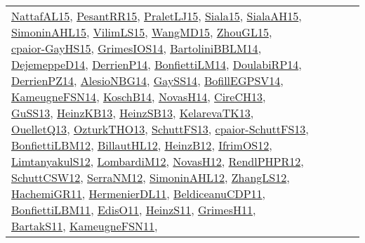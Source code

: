 {\begin{longtable}{lp{3cm}>{\raggedright}p{6cm}>{\raggedright}p{6cm}p{8cm}}
\href{articles/NattafAL15.pdf}{NattafAL15}\cite{NattafAL15}, \href{papers/PesantRR15.pdf}{PesantRR15}\cite{PesantRR15}, \href{papers/PraletLJ15.pdf}{PraletLJ15}\cite{PraletLJ15}, \href{articles/Siala15.pdf}{Siala15}\cite{Siala15}, \href{papers/SialaAH15.pdf}{SialaAH15}\cite{SialaAH15}, \href{articles/SimoninAHL15.pdf}{SimoninAHL15}\cite{SimoninAHL15}, \href{papers/VilimLS15.pdf}{VilimLS15}\cite{VilimLS15}, \href{articles/WangMD15.pdf}{WangMD15}\cite{WangMD15}, \href{papers/ZhouGL15.pdf}{ZhouGL15}\cite{ZhouGL15}, \href{papers/cpaior-GayHS15.pdf}{cpaior-GayHS15}\cite{cpaior-GayHS15}, \href{articles/GrimesIOS14.pdf}{GrimesIOS14}\cite{GrimesIOS14}, \href{papers/BartoliniBBLM14.pdf}{BartoliniBBLM14}\cite{BartoliniBBLM14}, \href{papers/DejemeppeD14.pdf}{DejemeppeD14}\cite{DejemeppeD14}, \href{papers/DerrienP14.pdf}{DerrienP14}\cite{DerrienP14}, \href{papers/BonfiettiLM14.pdf}{BonfiettiLM14}\cite{BonfiettiLM14}, \href{papers/DoulabiRP14.pdf}{DoulabiRP14}\cite{DoulabiRP14}, \href{papers/DerrienPZ14.pdf}{DerrienPZ14}\cite{DerrienPZ14}, \href{papers/AlesioNBG14.pdf}{AlesioNBG14}\cite{AlesioNBG14}, \href{papers/GaySS14.pdf}{GaySS14}\cite{GaySS14}, \href{papers/BofillEGPSV14.pdf}{BofillEGPSV14}\cite{BofillEGPSV14}, \href{articles/KameugneFSN14.pdf}{KameugneFSN14}\cite{KameugneFSN14}, \href{papers/KoschB14.pdf}{KoschB14}\cite{KoschB14}, \href{articles/NovasH14.pdf}{NovasH14}\cite{NovasH14}, \href{papers/CireCH13.pdf}{CireCH13}\cite{CireCH13}, \href{papers/GuSS13.pdf}{GuSS13}\cite{GuSS13}, \href{papers/HeinzKB13.pdf}{HeinzKB13}\cite{HeinzKB13}, \href{articles/HeinzSB13.pdf}{HeinzSB13}\cite{HeinzSB13}, \href{papers/KelarevaTK13.pdf}{KelarevaTK13}\cite{KelarevaTK13}, \href{papers/OuelletQ13.pdf}{OuelletQ13}\cite{OuelletQ13}, \href{articles/OzturkTHO13.pdf}{OzturkTHO13}\cite{OzturkTHO13}, \href{papers/SchuttFS13.pdf}{SchuttFS13}\cite{SchuttFS13}, \href{papers/cpaior-SchuttFS13.pdf}{cpaior-SchuttFS13}\cite{cpaior-SchuttFS13}, \href{papers/BonfiettiLBM12.pdf}{BonfiettiLBM12}\cite{BonfiettiLBM12}, \href{papers/BillautHL12.pdf}{BillautHL12}\cite{BillautHL12}, \href{papers/HeinzB12.pdf}{HeinzB12}\cite{HeinzB12}, \href{papers/IfrimOS12.pdf}{IfrimOS12}\cite{IfrimOS12}, \href{articles/LimtanyakulS12.pdf}{LimtanyakulS12}\cite{LimtanyakulS12}, \href{articles/LombardiM12.pdf}{LombardiM12}\cite{LombardiM12}, \href{articles/NovasH12.pdf}{NovasH12}\cite{NovasH12}, \href{papers/RendlPHPR12.pdf}{RendlPHPR12}\cite{RendlPHPR12}, \href{papers/SchuttCSW12.pdf}{SchuttCSW12}\cite{SchuttCSW12}, \href{papers/SerraNM12.pdf}{SerraNM12}\cite{SerraNM12}, \href{papers/SimoninAHL12.pdf}{SimoninAHL12}\cite{SimoninAHL12}, \href{papers/ZhangLS12.pdf}{ZhangLS12}\cite{ZhangLS12}, \href{articles/HachemiGR11.pdf}{HachemiGR11}\cite{HachemiGR11}, \href{papers/HermenierDL11.pdf}{HermenierDL11}\cite{HermenierDL11}, \href{articles/BeldiceanuCDP11.pdf}{BeldiceanuCDP11}\cite{BeldiceanuCDP11}, \href{papers/BonfiettiLBM11.pdf}{BonfiettiLBM11}\cite{BonfiettiLBM11}, \href{papers/EdisO11.pdf}{EdisO11}\cite{EdisO11}, \href{papers/HeinzS11.pdf}{HeinzS11}\cite{HeinzS11}, \href{papers/GrimesH11.pdf}{GrimesH11}\cite{GrimesH11}, \href{articles/BartakS11.pdf}{BartakS11}\cite{BartakS11}, \href{papers/KameugneFSN11.pdf}{KameugneFSN11}\cite{KameugneFSN11}, 
\end{longtable}}
